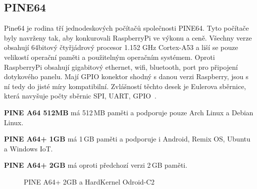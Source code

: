 	\subsection{PINE64}
Pine64 je rodina tří jednodeskových počítačů společnosti PINE64. Tyto počítače byly navrženy tak, aby konkurovali RaspberryPi ve výkonu a ceně. Všechny verze obsahují 64bitový čtyřjádrový procesor 1.152 GHz Cortex-A53 a liší se pouze velikostí operační paměti a použitelným operačním systémem. Oproti RaspberryPi obsahují gigabitový ethernet, wifi, bluetooth, port pro připojení dotykového panelu. Mají GPIO konektor shodný s danou verzi Raspberry, jsou s ní tedy do jisté míry kompatibilní. Zvlášností těchto desek je Eulerova sběrnice, která navyšuje počty sběrnic SPI, UART, GPIO~\cite{Pine64}.

\textbf{PINE A64 512MB} má 512\,MB paměti a podporuje pouze Arch Linux a Debian Linux.

\textbf{PINE A64+ 1GB} má 1\,GB paměti a podporuje i Android, Remix OS, Ubuntu a Windows IoT.

\textbf{PINE A64+ 2GB} má oproti předchozí verzi 2\,GB paměti.

	\begin{figure}[!ht]
	\vspace{-10pt}
    \centering
			\hspace*{5mm}
			\caption{PINE A64+ 2GB a HardKernel Odroid-C2}
			\vspace{-10pt}
\end{figure}

